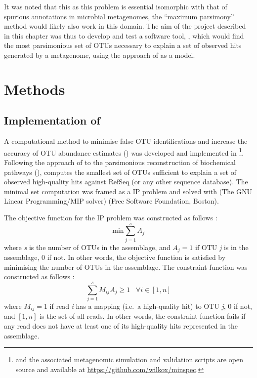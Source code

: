 It was noted that this as this problem is essential isomorphic with that of spurious annotations in microbial metagenomes, the ``maximum parsimony'' method would likely also work in this domain.
The aim of the project described in this chapter was thus to develop and test a software tool, , which would find the most parsimonious set of \acp{OTU} necessary to explain a set of observed  hits generated by a metagenome, using the approach of \cite{Ye:2009bl} as a model.

\section{Methods}

\subsection{Implementation of }

A computational method to minimise false \ac{OTU} identifications and increase the accuracy of \ac{OTU} abundance estimates () was developed and implemented in \footnote{ and the associated metagenomic simulation and validation scripts are open source and available at \url{https://github.com/wilkox/minspec}.}.
Following the approach of \citet{Ye:2009bl} to the parsimonious reconstruction of biochemical pathways (),  computes the smallest set of \acp{OTU} sufficient to explain a set of observed high-quality hits against RefSeq (or any other sequence database).
The minimal set computation was framed as a \ac{IP} problem and solved with  (The GNU Linear Programming/MIP solver) (Free Software Foundation, Boston).

The objective function for the \ac{IP} problem was constructed as follows \citep[adapted from][]{Ye:2009bl}:
\begin{equation*}
\mathrm{min}\sum_{j=1}^{s}A_{j}
\end{equation*}
where \textit{s} is the number of \acp{OTU} in the assemblage, and $A_{j} = 1$ if \ac{OTU} \textit{j} is in the assemblage, 0 if not.
In other words, the objective function is satisfied by minimising the number of \acp{OTU} in the assemblage.
The constraint function was constructed as follows \citep[adapted from][]{Ye:2009bl}:
\begin{equation*}
\sum_{j=1}^{s}M_{ij}A_{j}\ge1 \; \; \; \forall i \in [1,n]
\end{equation*}
where $M_{ij} = 1$ if read \textit{i} has a mapping (i.e.\ a high-quality  hit) to \ac{OTU} \textit{j}, 0 if not, and $[1,n]$ is the set of all reads.
In other words, the constraint function fails if any read does not have at least one of its high-quality  hits represented in the assemblage.


